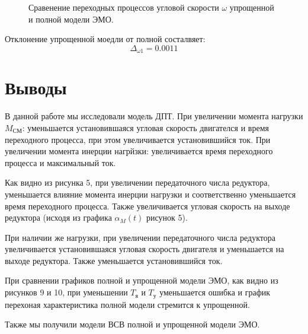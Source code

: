 \documentclass[a4paper, 11pt]{article}
\begin{document}
\begin{figure}[h!]
    \centering
    \caption{Сравенение переходных процессов угловой скорости $\omega$ упрощенной и полной модели ЭМО.}
\end{figure}

Отклонение упрощенной моедли от полной состалвяет:
\begin{equation}
    \Delta_{\omega1} = 0.0011
\end{equation}

\newpage
\section*{Выводы}
В данной работе мы исследовали модель ДПТ. При увеличении момента нагрузки $M_\text{СМ}$: уменьшается установившаяся угловая скорость двигателся и время переходного процесса, при этом увеличивается установившийся ток. При увеличении момента инерции нагрйзки: увеличивается время переходного процесса и максимальный ток. \par
Как видно из рисунка 5, при увеличении передаточного числа редуктора, уменьшается влияние момента инерции нагрузки и соответственно уменьшается время переходного процесса. Также увеличивается угловая скорость на выходе редуктора (исходя из графика $\alpha_M(t)$ рисунок 5). \par
При наличии же нагрузки, при увеличении передаточного числа редуктора увеличивается установившаяся угловая скорость двигателя и уменьшается на выходе редуктора. Также уменьшается установившийся ток. \par
При сравнении графиков полной и упрощенной модели ЭМО, как видно из рисунков 9 и 10, при уменьшении $T_\text{я}$ и $T_\text{у}$ уменьшается ошибка и график перехоная характеристика полной модели стремится к упрощенной. \par
Также мы получили модели ВСВ полной и упрощенной модели ЭМО. 
\end{document}
